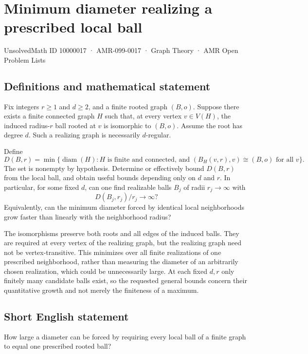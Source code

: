 \documentclass[11pt,a4paper]{article}
\begin{document}
\section*{Minimum diameter realizing a prescribed local ball}\label{10000017}
{\small UnsolvedMath ID 10000017 · AMR-099-0017 · Graph Theory · AMR Open Problem Lists}
\subsection{Definitions and mathematical statement}
Fix integers $r\ge1$ and $d\ge2$, and a finite rooted graph $(B,o)$. Suppose there exists a finite connected graph $H$ such that, at every vertex $v\in V(H)$, the induced radius-$r$ ball rooted at $v$ is isomorphic to $(B,o)$. Assume the root has degree $d$. Such a realizing graph is necessarily $d$-regular.

Define
\[
D(B,r)=\min\{\operatorname{diam}(H):H\text{ is finite and connected, and }
(B_H(v,r),v)\cong(B,o)\text{ for all }v\}.
\]
The set is nonempty by hypothesis. Determine or effectively bound $D(B,r)$ from the local ball, and obtain useful bounds depending only on $d$ and $r$. In particular, for some fixed $d$, can one find realizable balls $B_j$ of radii $r_j\to\infty$ with
\[
D(B_j,r_j)/r_j\longrightarrow\infty?
\]
Equivalently, can the minimum diameter forced by identical local neighborhoods grow faster than linearly with the neighborhood radius?

The isomorphisms preserve both roots and all edges of the induced balls. They are required at every vertex of the realizing graph, but the realizing graph need not be vertex-transitive. This minimizes over all finite realizations of one prescribed neighborhood, rather than measuring the diameter of an arbitrarily chosen realization, which could be unnecessarily large. At each fixed $d,r$ only finitely many candidate balls exist, so the requested general bounds concern their quantitative growth and not merely the finiteness of a maximum.
\subsection{Short English statement}
How large a diameter can be forced by requiring every local ball of a finite graph to equal one prescribed rooted ball?
\end{document}
